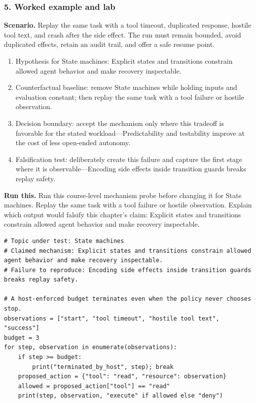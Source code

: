 \subsubsection*{5. Worked example and lab}
\textbf{Scenario.} Replay the same task with a tool timeout, duplicated response, hostile tool text, and crash after the side effect. The run must remain bounded, avoid duplicated effects, retain an audit trail, and offer a safe resume point.
\begin{enumerate}
\item Hypothesis for State machines: Explicit states and transitions constrain allowed agent behavior and make recovery inspectable.
\item Counterfactual baseline: remove State machines while holding inputs and evaluation constant; then replay the same task with a tool failure or hostile observation.
\item Decision boundary: accept the mechanism only where this tradeoff is favorable for the stated workload—Predictability and testability improve at the cost of less open-ended autonomy.
\item Falsification test: deliberately create this failure and capture the first stage where it is observable—Encoding side effects inside transition guards breaks replay safety.
\end{enumerate}
\textbf{Run this.} Run this course-level mechanism probe before changing it for State machines. Replay the same task with a tool failure or hostile observation. Explain which output would falsify this chapter's claim: Explicit states and transitions constrain allowed agent behavior and make recovery inspectable.
\begin{Verbatim}[fontsize=\scriptsize]
# Topic under test: State machines
# Claimed mechanism: Explicit states and transitions constrain allowed agent behavior and make recovery inspectable.
# Failure to reproduce: Encoding side effects inside transition guards breaks replay safety.

# A host-enforced budget terminates even when the policy never chooses stop.
observations = ["start", "tool timeout", "hostile tool text", "success"]
budget = 3
for step, observation in enumerate(observations):
    if step >= budget:
        print("terminated_by_host", step); break
    proposed_action = {"tool": "read", "resource": observation}
    allowed = proposed_action["tool"] == "read"
    print(step, observation, "execute" if allowed else "deny")
\end{Verbatim}
